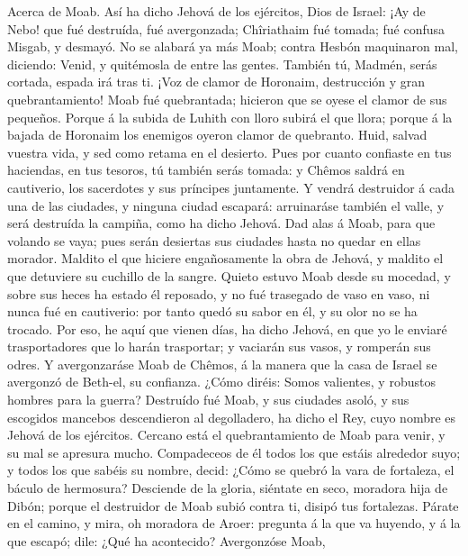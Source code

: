  Acerca de Moab. Así ha dicho Jehová de los ejércitos, Dios
de Israel: ¡Ay de Nebo! que fué destruída, fué avergonzada; Chîriathaim
fué tomada; fué confusa Misgab, y desmayó.  No se alabará ya
más Moab; contra Hesbón maquinaron mal, diciendo: Venid, y quitémosla de
entre las gentes. También tú, Madmén, serás cortada, espada irá tras ti.
 ¡Voz de clamor de Horonaim, destrucción y gran
quebrantamiento!  Moab fué quebrantada; hicieron que se
oyese el clamor de sus pequeños.  Porque á la subida de
Luhith con lloro subirá el que llora; porque á la bajada de Horonaim los
enemigos oyeron clamor de quebranto.  Huid, salvad vuestra
vida, y sed como retama en el desierto.  Pues por cuanto
confiaste en tus haciendas, en tus tesoros, tú también serás tomada: y
Chêmos saldrá en cautiverio, los sacerdotes y sus príncipes juntamente.
 Y vendrá destruidor á cada una de las ciudades, y ninguna
ciudad escapará: arruinaráse también el valle, y será destruída la
campiña, como ha dicho Jehová.  Dad alas á Moab, para que
volando se vaya; pues serán desiertas sus ciudades hasta no quedar en
ellas morador.  Maldito el que hiciere engañosamente la
obra de Jehová, y maldito el que detuviere su cuchillo de la sangre.
 Quieto estuvo Moab desde su mocedad, y sobre sus heces ha
estado él reposado, y no fué trasegado de vaso en vaso, ni nunca fué en
cautiverio: por tanto quedó su sabor en él, y su olor no se ha trocado.
 Por eso, he aquí que vienen días, ha dicho Jehová, en que
yo le enviaré trasportadores que lo harán trasportar; y vaciarán sus
vasos, y romperán sus odres.  Y avergonzaráse Moab de
Chêmos, á la manera que la casa de Israel se avergonzó de Beth-el, su
confianza.  ¿Cómo diréis: Somos valientes, y robustos
hombres para la guerra?  Destruído fué Moab, y sus ciudades
asoló, y sus escogidos mancebos descendieron al degolladero, ha dicho el
Rey, cuyo nombre es Jehová de los ejércitos.  Cercano está
el quebrantamiento de Moab para venir, y su mal se apresura mucho.
 Compadeceos de él todos los que estáis alrededor suyo; y
todos los que sabéis su nombre, decid: ¿Cómo se quebró la vara de
fortaleza, el báculo de hermosura?  Desciende de la gloria,
siéntate en seco, moradora hija de Dibón; porque el destruidor de Moab
subió contra ti, disipó tus fortalezas.  Párate en el
camino, y mira, oh moradora de Aroer: pregunta á la que va huyendo, y á
la que escapó; dile: ¿Qué ha acontecido?  Avergonzóse Moab,
